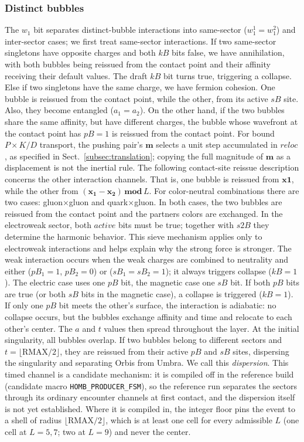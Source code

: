 \documentclass[a4paper]{article}
\begin{document}
\subsubsection{Distinct bubbles} \label{subsec:distinct}
The $w_1$ bit separates distinct-bubble interactions into same-sector ($w_1^1=w_1^2$) and inter-sector cases; we first treat same-sector interactions.
If two same-sector singletons have opposite charges and both $kB$ bits false, we have annihilation, with both bubbles being reissued from the contact point and their affinity receiving their default values. The draft $kB$ bit turns true, triggering a collapse.
Else if two singletons have the same charge, we have fermion cohesion.
One bubble is reissued from the contact point, while the other, from its active $sB$ site.
Also, they become entangled ($a_1=a_2$).
On the other hand, if the two bubbles share the same affinity, but have different charges, the bubble whose wavefront at the contact point has $pB=1$ is reissued from the contact point.
For bound $P\times K/D$ transport, the pushing pair's $\boldsymbol{m}$ selects a unit step accumulated in $\boldsymbol{\mathit{reloc}}$, as specified in Sect.~\ref{subsec:translation}; copying the full magnitude of $\boldsymbol{m}$ as a displacement is not the inertial rule. The following contact-site reissue description concerns the other interaction channels.
That is, one bubble is reissued from $\boldsymbol{x1}$, while the other from $(\boldsymbol{x_1}-\boldsymbol{x_2})\,\boldsymbol{mod}\,L$.
For color-neutral combinations there are two cases: gluon$\times$gluon and quark$\times$gluon.
In both cases, the two bubbles are reissued from the contact point and the partners colors are exchanged.
In the electroweak sector, both $\mathit{active}$ bits must be true; together with $s2B$ they determine the harmonic behavior. This sieve mechanism applies only to electroweak interactions and helps explain why the strong force is stronger.
The weak interaction occurs when the weak charges are combined to neutrality and either ($pB_1=1$, $pB_2=0$) or ($sB_1=sB_2=1$); it always triggers collapse ($kB=1$).
The electric case uses one $pB$ bit, the magnetic case one $sB$ bit. If both $pB$ bits are true (or both $sB$ bits in the magnetic case), a collapse is triggered ($kB=1$).
If only one $pB$ bit meets the other's surface, the interaction is adiabatic: no collapse occurs, but the bubbles exchange affinity and time and relocate to each other's center. The $a$ and $t$ values then spread throughout the layer.
At the initial singularity, all bubbles overlap. If two bubbles belong to different sectors and $t=\lfloor\mathrm{RMAX}/2\rfloor$, they are reissued from their active $pB$ and $sB$ sites, dispersing the singularity and separating Orbis from Umbra. We call this \textit{dispersion}. This timed channel is a candidate mechanism: it is compiled off in the reference build (candidate macro \texttt{HOMB\_PRODUCER\_FSM}), so the reference run separates the sectors through its ordinary encounter channels at first contact, and the dispersion itself is not yet established. Where it is compiled in, the integer floor pins the event to a shell of radius $\lfloor\mathrm{RMAX}/2\rfloor$, which is at least one cell for every admissible $L$ (one cell at $L=5,7$; two at $L=9$) and never the center.
\end{document}
